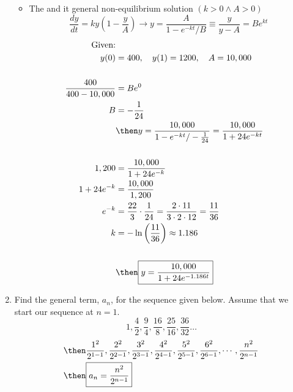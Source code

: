 \documentclass{nosvagor-notes}
\begin{document}
\begin{enumerate}
    \begin{itemize}
      \item The  and it general non-equilibrium solution
    \((k>0 \land A > 0)\)
    \[%
      \frac{dy}{dt} = ky(1-\frac{y}{A}) \to y = \frac{A}{1-e^{-kt}/B} \equiv \frac{y}{y-A} = Be^{kt}
    \]%
    \begin{align*}
      ~\text{Given:}\\
      y(0) &= 400, \quad y(1) = 1200, \quad A = 10,000 \\\\
      \frac{400}{400-10,000} &= Be^0 \\
      B &= -\frac{1}{24} \\
        &\then y = \frac{10,000}{1-e^{-kt}/-\frac{1}{24}} =
        \frac{10,000}{1+24e^{-kt}}\\\\
      1,200 &= \frac{10,000}{1+24e^{-k}} \\
      1+24e^{-k} &= \frac{10,000}{1,200} \\
    e^{-k} &= \frac{22}{3} \cdot \frac{1}{24} = \frac{2\cdot 11}{3\cdot 2 \cdot 12} = \frac{11}{36}\\
    k &= -\ln \left(\frac{11}{36}\right) \approx 1.186 \\\\
      &\then \boxed{y = \frac{10,000}{1+24e^{-1.186 t}}}
    \end{align*}
    \end{itemize}


  \newpage

  \item Find the general term, \(a_n\), for the sequence given below. Assume that
  we start our sequence at \(n=1\).
  \[%
    1,\frac{4}{2}, \frac{9}{4}, \frac{16}{8}, \frac{25}{16}, \frac{36}{32}\ldots
  \]%
  \begin{align*}
    &\then
    \frac{1^2}{2^{1-1}},
    \frac{2^2}{2^{2-1}},
    \frac{3^2}{2^{3-1}},
    \frac{4^2}{2^{4-1}},
    \frac{5^2}{2^{5-1}},
    \frac{6^2}{2^{6-1}}, \cdots, \frac{n^2}{2^{n-1}} \\
    &\then \boxed{ a_n = \frac{n^2}{2^{n-1}}}
  \end{align*}
  \vspace{20pt}


\end{enumerate}
\end{document}
